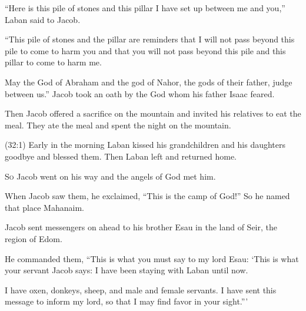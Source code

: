 \begin{scripture}
 ``Here is this pile of stones and this pillar I have set up between me and you,'' Laban said to Jacob.
 ``This pile of stones and the pillar are reminders that I will not pass beyond this pile to come to harm you and that you will not pass beyond this pile and this pillar to come to harm me.
 May the God of Abraham and the god of Nahor, the gods of their father, judge between us.'' Jacob took an oath by the God whom his father Isaac feared.
 Then Jacob offered a sacrifice on the mountain and invited his relatives to eat the meal. They ate the meal and spent the night on the mountain.
\everypar{}

 (32:1) Early in the morning Laban kissed his grandchildren and his daughters goodbye and blessed them. Then Laban left and returned home.

 \allowchapbreak\hypertarget{ch-genesis-32}{}\lettrine[lines=5]{\color{pentateuch}S}{\textsc{o}} Jacob went on his way and the angels of God met him.\everypar{}
 When Jacob saw them, he exclaimed, ``This is the camp of God!'' So he named that place Mahanaim.
\\\indent{} Jacob sent messengers on ahead to his brother Esau in the land of Seir, the region of Edom.
 He commanded them, ``This is what you must say to my lord Esau: `This is what your servant Jacob says: I have been staying with Laban until now.
 I have oxen, donkeys, sheep, and male and female servants. I have sent this message to inform my lord, so that I may find favor in your sight.'''
\everypar{}


\end{scripture}
